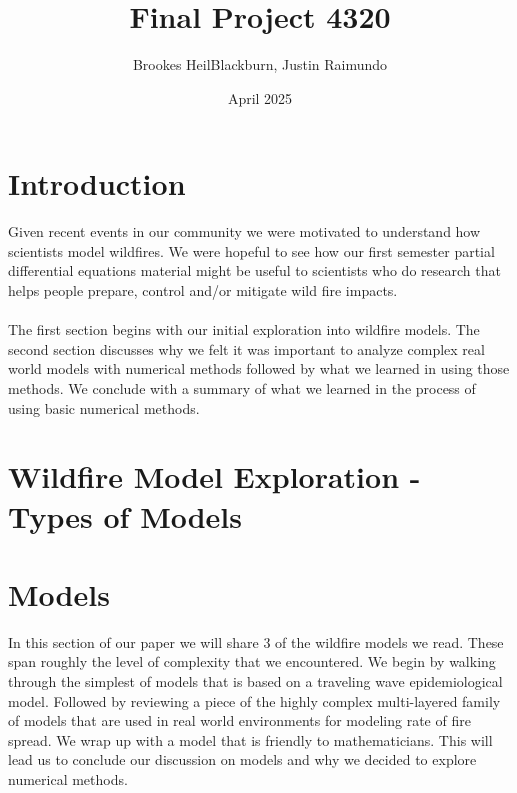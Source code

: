 \documentclass{article}
\title{Final Project 4320}
\author{Brookes HeilBlackburn, Justin Raimundo}
\date{April 2025}
\begin{document}
\maketitle

\section*{Introduction}
Given recent events in our community we were motivated to understand how scientists model wildfires.  We were hopeful to see how our first semester partial differential equations material might be useful to scientists who do research that helps people prepare, control and/or mitigate wild fire impacts.\\\\
The first section begins with our initial exploration into wildfire models.  The second section discusses why we felt it was important to analyze complex real world models with numerical methods followed by what we learned in using those methods.  We conclude with a summary of what we learned in the process of using basic numerical methods.

\section*{Wildfire Model Exploration - Types of Models}
\section{Models}
In this section of our paper we will share 3 of the wildfire models we read.  These span roughly the level of complexity that we encountered.  We begin by walking through the simplest of models that is based on a traveling wave epidemiological model.  Followed by reviewing a piece of the highly complex multi-layered family of models that are used in real world environments for modeling rate of fire spread.  We wrap up with a model that is friendly to mathematicians.  This will lead us to conclude our discussion on models and why we decided to explore numerical methods.
\end{document}
